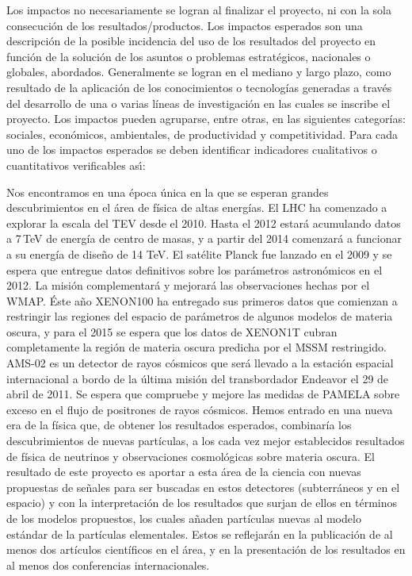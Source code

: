 \begin{instrucciones}
  Los impactos no necesariamente se logran al finalizar el proyecto, ni
con la sola consecución de los resultados/productos. Los impactos
esperados son una descripción de la posible incidencia del uso de los
resultados del proyecto en función de la solución de los asuntos o
problemas estratégicos, nacionales o globales, abordados. Generalmente
se logran en el mediano y largo plazo, como resultado de la aplicación
de los conocimientos o tecnologías generadas a través del desarrollo
de una o varias líneas de investigación en las cuales se inscribe el
proyecto. Los impactos pueden agruparse, entre otras, en las
siguientes categorías: sociales, económicos, ambientales, de
productividad y competitividad. Para cada uno de los impactos
esperados se deben identificar indicadores cualitativos o
cuantitativos verificables as\'\i:
\end{instrucciones}


Nos encontramos en una época única en la que se esperan grandes
descubrimientos en el área de física de altas energías. El LHC ha
comenzado a explorar la escala del TEV desde el 2010. Hasta el 2012
estará acumulando datos a 7\,TeV de energía de centro de masas, y a
partir del 2014 comenzará a funcionar a su energía de diseño de 14
TeV. El satélite Planck fue lanzado en el 2009 y se espera que
entregue datos definitivos sobre los parámetros astronómicos en el
2012. La misión complementará y mejorará las observaciones hechas por
el WMAP. Éste año XENON100 ha entregado sus primeros datos que
comienzan a restringir las regiones del espacio de parámetros de
algunos modelos de materia oscura, y para el 2015 se espera que los
datos de XENON1T cubran completamente la región de materia oscura
predicha por el MSSM restringido. AMS-02 es un detector de rayos
cósmicos que será llevado a la estación espacial internacional a bordo
de la última misión del transbordador Endeavor el 29 de abril de
2011. Se espera que compruebe y mejore las medidas de PAMELA sobre
exceso en el flujo de positrones de rayos cósmicos. Hemos entrado en
una nueva era de la física que, de obtener los resultados esperados,
combinaría los descubrimientos de nuevas partículas, a los cada vez
mejor establecidos resultados de física de neutrinos y observaciones
cosmológicas sobre materia oscura. El resultado de este proyecto es
aportar a esta área de la ciencia con nuevas propuestas de señales
para ser buscadas en estos detectores (subterráneos y en el espacio) y
con la interpretación de los resultados que surjan de ellos en
términos de los modelos propuestos, los cuales añaden partículas
nuevas al modelo estándar de la partículas elementales. Estos se
reflejarán en la publicación de al menos dos artículos científicos en
el área, y en la presentación de los resultados en al menos dos
conferencias internacionales.


